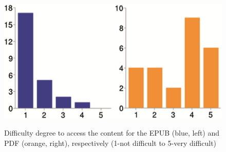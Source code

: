 \begin{figure}
	\includegraphics[width=\linewidth]{figures/easeOfContentAccess.png}
	\caption{Difficulty degree to access the content for the EPUB (blue, left) and PDF (orange, right), respectively (1-not difficult
		to 5-very difficult)}\cite{enrichEPUB}
	\label{fig:enrichEpub1}
\end{figure}

